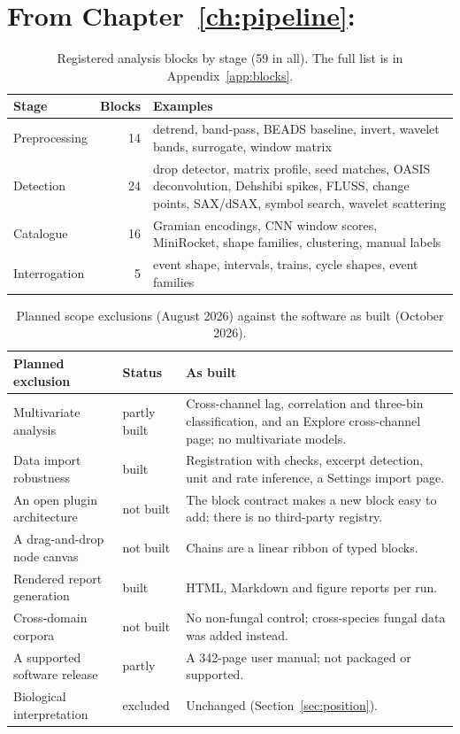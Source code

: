 \clearpage

\section*{From Chapter~\ref{ch:pipeline}: \tool{}}

\begin{table}[htbp]
\caption[{Registered analysis blocks by stage (59 in all).}]{Registered analysis blocks by stage (59 in all). The full list is in Appendix~\ref{app:blocks}.}
\label{tab:blockstages}
\small
\begin{tabularx}{\textwidth}{p{2.6cm} r X}
\toprule
\textbf{Stage} & \textbf{Blocks} & \textbf{Examples}\\
\midrule
Preprocessing & 14 & detrend, band-pass, BEADS baseline, invert, wavelet bands, surrogate, window matrix\\
Detection & 24 & drop detector, matrix profile, seed matches, OASIS deconvolution, Dehshibi spikes, FLUSS, change points, SAX/dSAX, symbol search, wavelet scattering\\
Catalogue & 16 & Gramian encodings, CNN window scores, MiniRocket, shape families, clustering, manual labels\\
Interrogation & 5 & event shape, intervals, trains, cycle shapes, event families\\
\bottomrule
\end{tabularx}
\end{table}

\begin{table}[htbp]
\caption[{Planned scope exclusions against the software as built.}]{Planned scope exclusions (August 2026) against the software as built (October 2026).}
\label{tab:scope}
\small
\begin{tabularx}{\textwidth}{p{4.2cm} p{2.2cm} X}
\toprule
\textbf{Planned exclusion} & \textbf{Status} & \textbf{As built}\\
\midrule
Multivariate analysis & partly built & Cross-channel lag, correlation and three-bin classification, and an Explore cross-channel page; no multivariate models.\\
Data import robustness & built & Registration with checks, excerpt detection, unit and rate inference, a Settings import page.\\
An open plugin architecture & not built & The block contract makes a new block easy to add; there is no third-party registry.\\
A drag-and-drop node canvas & not built & Chains are a linear ribbon of typed blocks.\\
Rendered report generation & built & HTML, Markdown and figure reports per run.\\
Cross-domain corpora & not built & No non-fungal control; cross-species fungal data was added instead.\\
A supported software release & partly & A 342-page user manual; not packaged or supported.\\
Biological interpretation & excluded & Unchanged (Section~\ref{sec:position}).\\
\bottomrule
\end{tabularx}
\end{table}

